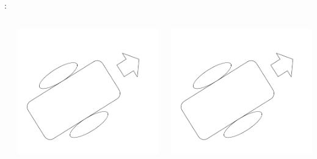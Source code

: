\documentclass[aspectratio=169,dvipdfmx,cjk]{beamer}
\begin{document}
\begin{frame}{\insertsection \thesubsection: \insertsubsection}
\begin{columns}
\begin{column}{0.33\textwidth}
    \end{column}
    \begin{column}{0.33\textwidth}
      \includegraphics[width=1.0\linewidth]{fig/robot.png}
    \end{column}
    \begin{column}{0.33\textwidth}
      \includegraphics[width=1.0\linewidth]{fig/robot.png}
    \end{column}
  \end{columns}
\end{frame}
\end{document}
